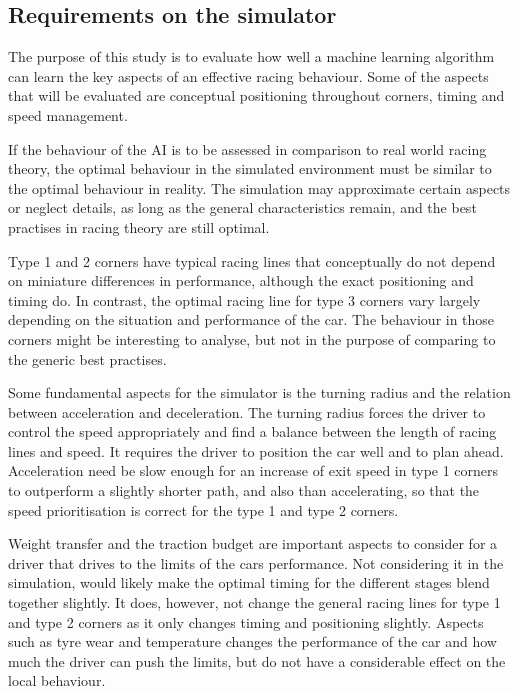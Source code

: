 \subsection{Requirements on the simulator}
\label{requirements}
The purpose of this study is to evaluate how well a machine learning algorithm can learn the key aspects of an effective racing behaviour. Some of the aspects that will be evaluated are conceptual positioning throughout corners, timing and speed management.

If the behaviour of the AI is to be assessed in comparison to real world racing theory, the optimal behaviour in the simulated environment must be similar to the optimal behaviour in reality. The simulation may approximate certain aspects or neglect details, as long as the general characteristics remain, and the best practises in racing theory are still optimal. 

Type 1 and 2 corners have typical racing lines that conceptually do not depend on miniature differences in performance, although the exact positioning and timing do. In contrast, the optimal racing line for type 3 corners vary largely depending on the situation and performance of the car. The behaviour in those corners might be interesting to analyse, but not in the purpose of comparing to the generic best practises.

Some fundamental aspects for the simulator is the turning radius and the relation between acceleration and deceleration. The turning radius forces the driver to control the speed appropriately and find a balance between the length of racing lines and speed. It requires the driver to position the car well and to plan ahead. Acceleration need be slow enough for an increase of exit speed in type 1 corners to outperform a slightly shorter path, and also than accelerating, so that the speed prioritisation is correct for the type 1 and type 2 corners. 

Weight transfer and the traction budget are important aspects to consider for a driver that drives to the limits of the cars performance. Not considering it in the simulation, would likely make the optimal timing for the different stages blend together slightly. It does, however, not change the general racing lines for type 1 and type 2 corners as it only changes timing and positioning slightly. Aspects such as tyre wear and temperature changes the performance of the car and how much the driver can push the limits, but do not have a considerable effect on the local behaviour. 

